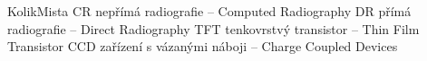 \begin{seznamzkratek}{KolikMista}
			{CR}
			{nepřímá radiografie -- Computed Radiography}
			{DR}
			{přímá radiografie -- Direct Radiography}
			{TFT}
			{tenkovrstvý transistor -- Thin Film Transistor}
			{CCD}
			{zařízení s vázanými náboji -- Charge Coupled Devices}
\end{seznamzkratek}
